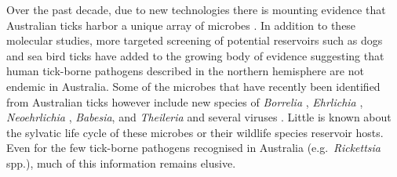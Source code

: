 \documentclass[a4paper, nobind]{templates/ociamthesis}
\begin{document}
Over the past decade, due to new technologies there is mounting evidence that Australian ticks harbor a unique array of microbes \autocite{goftonInhibitionEndosymbiontCandidatus2015,eganBacterialCommunityProfiling2020}.
In addition to these molecular studies, more targeted screening of potential reservoirs such as dogs \autocite{irwinSearchingLymeBorreliosis2017} and sea bird ticks \autocite{moonAustralianPenguinTicks2018} have added to the growing body of evidence suggesting that human tick-borne pathogens described in the northern hemisphere are not endemic in Australia.
Some of the microbes that have recently been identified from Australian ticks however include new species of \emph{Borrelia} \autocite{lohMolecularCharacterizationCandidatus2017,panettaReptileassociatedBorreliaSpecies2017}, \emph{Ehrlichia} \autocite{goftonDetectionPhylogeneticCharacterisation2017}, \emph{Neoehrlichia} \autocite{goftonPhylogeneticCharacterisationTwo2016}, \emph{Babesia}, and \emph{Theileria} \autocite{greayEndemicExoticNovel2018,lohMolecularSurveillancePiroplasms2018} and several viruses \autocite{obrienDiscoveryNovelIflavirus2018,harveyExtensiveDiversityRNA2019}.
Little is known about the sylvatic life cycle of these microbes or their wildlife species reservoir hosts. Even for the few tick-borne pathogens recognised in Australia (e.g.~\emph{Rickettsia} spp.), much of this information remains elusive.
\end{document}
